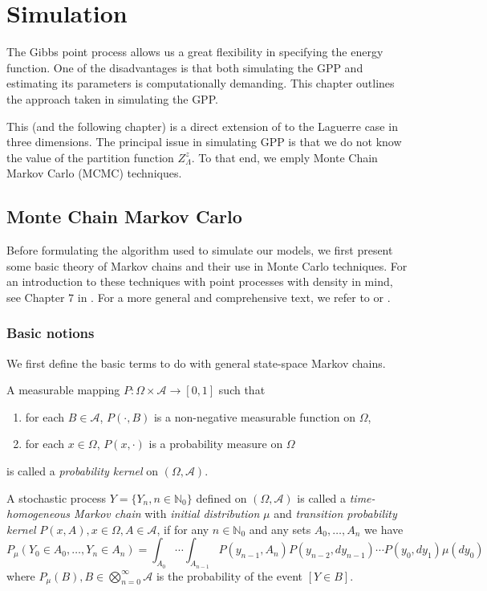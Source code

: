\chapter{Simulation}\label{ch:simulation}
The Gibbs point process allows us a great flexibility in specifying the energy function. One of the disadvantages is that both simulating the GPP and estimating its parameters is computationally demanding. This chapter outlines the approach taken in simulating the GPP. 

This (and the following chapter) is a direct extension of \cite{DereudreLavancier2011} to the Laguerre case in three dimensions.
The principal issue in simulating GPP is that we do not know the value of the partition function $Z^z_\Lambda$. To that end, we emply Monte Chain Markov Carlo (MCMC) techniques.

\section{Monte Chain Markov Carlo}
Before formulating the algorithm used to simulate our models, we first present some basic theory of Markov chains and their use in Monte Carlo techniques. For an introduction to these techniques with point processes with density in mind, see Chapter $7$ in \cite{MollerWaagepetersen2003}. For a more general and comprehensive text, we refer to \cite{RobertCasella2004} or \cite{MeynTweedie1993}.

\subsection{Basic notions}
We first define the basic terms to do with general state-space Markov chains.

\begin{definition}
A measurable mapping $P:\Omega\times \mathcal A \to [0,1]$ such that
\begin{enumerate}
\item for each $B \in \mathcal A$, $P(\cdot, B)$ is a non-negative measurable function on $\Omega$,
\item for each $x \in \Omega$, $P(x,\cdot)$ is a probability measure on $\Omega$
\end{enumerate}
is called a \textit{probability kernel} on $(\Omega, \mathcal A)$.
\end{definition}

\begin{definition} A stochastic process $Y=\{Y_n,n \in \mathbb N_0\}$ defined on $(\Omega,\mathcal A)$ is called a \textit{time-homogeneous Markov chain} with \textit{initial distribution} $\mu$ and \textit{transition probability kernel} $P(x,A),x\in\Omega,A \in \mathcal A$, if for any $n\in \mathbb N_0$ and any sets $A_0,\dots,A_n$ we have
$$P_\mu(Y_0\in A_0,\dots, Y_n \in A_n) = \int_{A_0} \cdots \int_{A_{n-1}} P(y_{n-1},A_n) P(y_{n-2},dy_{n-1}) \cdots P(y_0,dy_1)\mu(dy_0)$$
where $P_\mu(B), B \in \bigotimes^\infty_{n=0} \mathcal A$ is the probability of the event $[Y\in B]$.
\end{definition}

